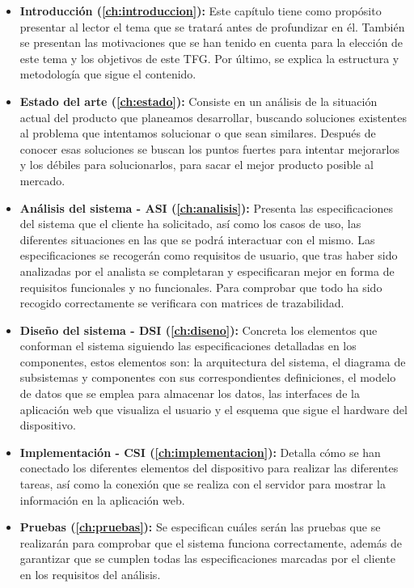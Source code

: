 \begin{itemize}
	\item \textbf{Introducción (\autoref{ch:introduccion}):} Este capítulo tiene como propósito presentar al lector el tema que se tratará antes de profundizar en él. También se presentan las motivaciones que se han tenido en cuenta para la elección de este tema y los objetivos de este TFG. Por último, se explica la estructura y metodología que sigue el contenido.
	\item \textbf{Estado del arte (\autoref{ch:estado}):} Consiste en un análisis de la situación actual del producto que planeamos desarrollar, buscando soluciones existentes al problema que intentamos solucionar o que sean similares. Después de conocer esas soluciones se buscan los puntos fuertes para intentar mejorarlos y los débiles para solucionarlos, para sacar el mejor producto posible al mercado.
	\item \textbf{Análisis del sistema - ASI (\autoref{ch:analisis}):} Presenta las especificaciones del sistema que el cliente ha solicitado, así como los casos de uso, las diferentes situaciones en las que se podrá interactuar con el mismo. Las especificaciones se recogerán como requisitos de usuario, que tras haber sido analizadas por el analista se completaran y especificaran mejor en forma de requisitos funcionales y no funcionales. Para comprobar que todo ha sido recogido correctamente se verificara con matrices de trazabilidad.
	\item \textbf{Diseño del sistema - DSI (\autoref{ch:diseno}):} Concreta los elementos que conforman el sistema siguiendo las especificaciones detalladas en los componentes, estos elementos son: la arquitectura del sistema, el diagrama de subsistemas y componentes con sus correspondientes definiciones, el modelo de datos que se emplea para almacenar los datos, las interfaces de la aplicación web que visualiza el usuario y el esquema que sigue el hardware del dispositivo. 
	\item \textbf{Implementación - CSI (\autoref{ch:implementacion}):} Detalla cómo se han conectado los diferentes elementos del dispositivo para realizar las diferentes tareas, así como la conexión que se realiza con el servidor para mostrar la información en la aplicación web.
	\item \textbf{Pruebas (\autoref{ch:pruebas}):} Se especifican cuáles serán las pruebas que se realizarán para comprobar que el sistema funciona correctamente, además de garantizar que se cumplen todas las especificaciones marcadas por el cliente en los requisitos del análisis.

\end{itemize}
